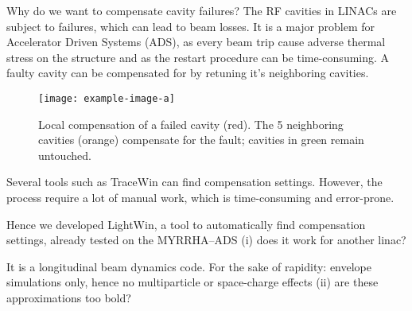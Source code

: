 

% 


\begin{frame}[t]
   \begin{columns}[t]
      \separatorcolumn
      \begin{column}{\colwidth}
         \begin{block}{Why do we want to compensate cavity failures?}
            The RF cavities in LINACs are subject to failures, which can lead to beam losses.
            It is a major problem for Accelerator Driven Systems (ADS), as every beam trip cause adverse thermal stress on the structure and as the restart procedure can be time-consuming.
            A faulty cavity can be compensated for by retuning it's neighboring cavities.
            \begin{figure}
               \centering
               \texttt{[image: example-image-a]}
               \caption{%
                  Local compensation of a failed cavity (red).
                  The \num{5} neighboring cavities (orange) compensate for the fault; cavities in green remain untouched.
               }
               \label{fig:compensation_scheme}
            \end{figure}
            Several tools such as TraceWin can find compensation settings.
            However, the process require a lot of manual work, which is time-consuming and error-prone.

            Hence we developed LightWin, a tool to automatically find compensation settings, already tested on the MYRRHA--ADS \alert{(i) does it work for another linac?}

            It is a longitudinal beam dynamics code.
            For the sake of rapidity: envelope simulations only, hence no multiparticle or space-charge effects \alert{(ii) are these approximations too bold?}
         \end{block}


\end{column}
\end{columns}
\end{frame}
